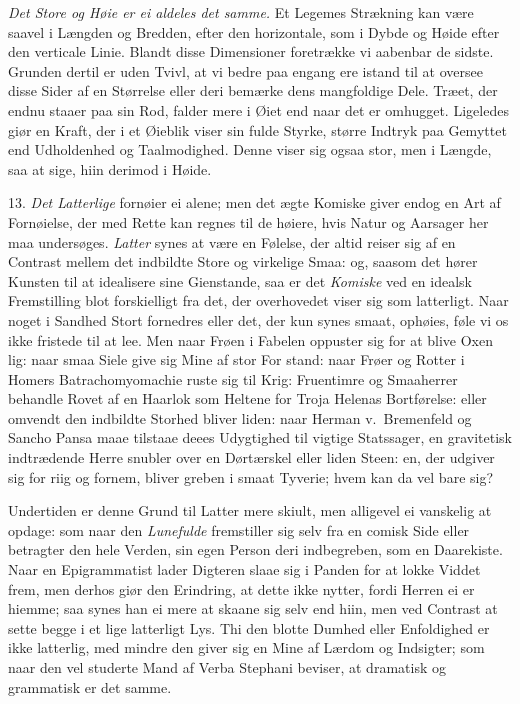 \documentclass[12pt,a4paper]{article}
\newcommand{\opage}[1]{\marginnote{\footnotesize\textit{[#1]}}}
\begin{document}
\opage{257} \emph{Det Store og Høie er ei aldeles det samme.} Et Legemes Strækning kan være saavel i
Længden og Bredden, efter den horizontale, som i Dybde og Høide efter den verticale Linie.
Blandt disse Dimensioner foretrække vi aabenbar de sidste. Grunden dertil er uden Tvivl, at
vi bedre paa engang ere istand til at oversee disse Sider af en Størrelse eller deri
bemærke dens mangfoldige Dele. Træet, der endnu staaer paa sin Rod, falder mere i Øiet end
naar det er omhugget. Ligeledes giør en Kraft, der i et Øieblik viser sin fulde Styrke,
større Indtryk paa Gemyttet end Udholdenhed og Taalmodighed. Denne viser sig ogsaa stor,
men i Længde, saa at sige, hiin derimod i Høide.

13. \emph{Det Latterlige} fornøier ei alene; men det ægte Komiske giver endog en Art af
Fornøielse, der med Rette kan regnes til de høiere, hvis Natur og Aarsager her maa
undersøges. \emph{Latter} synes at være en Følelse, der altid reiser sig af en Contrast
mellem det indbildte Store og virkelige Smaa: og, saasom det hører Kunsten til at idealisere
sine Gienstande, saa er det \emph{Komiske} ved en idealsk Fremstilling blot forskielligt fra
det, der overhovedet viser sig som latterligt. Naar noget i Sandhed Stort fornedres eller
det, der kun synes smaat, ophøies, føle vi os ikke fristede til at lee. Men naar Frøen i
Fabelen oppuster sig for at blive Oxen lig: naar smaa Siele give sig Mine af stor For%
\opage{258}stand: naar Frøer og Rotter i Homers Batrachomyomachie ruste sig til Krig: Fruentimre og
Smaaherrer behandle Rovet af en Haarlok som Heltene for Troja Helenas Bortførelse: eller
omvendt den indbildte Storhed bliver liden: naar Herman v.\ Bremenfeld og Sancho Pansa maae
tilstaae deees Udygtighed til vigtige Statssager, en gravitetisk indtrædende Herre snubler
over en Dørtærskel eller liden Steen: en, der udgiver sig for riig og fornem, bliver greben
i smaat Tyverie; hvem kan da vel bare sig?

Undertiden er denne Grund til Latter mere skiult, men alligevel ei vanskelig at opdage: som
naar den \emph{Lunefulde} fremstiller sig selv fra en comisk Side eller betragter den hele
Verden, sin egen Person deri indbegreben, som en Daarekiste. Naar en Epigrammatist lader
Digteren slaae sig i Panden for at lokke Viddet frem, men derhos giør den Erindring, at
dette ikke nytter, fordi Herren ei er hiemme; saa synes han ei mere at skaane sig selv end
hiin, men ved Contrast at sette begge i et lige latterligt Lys. Thi den blotte Dumhed eller
Enfoldighed er ikke latterlig, med mindre den giver sig en Mine af Lærdom og Indsigter; som
naar den vel studerte Mand af Verba Stephani beviser, at dramatisk og grammatisk er det
samme.
\end{document}
